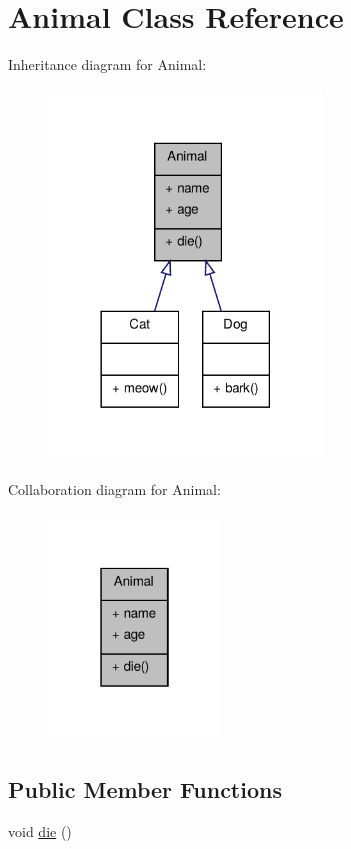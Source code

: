 \hypertarget{class_animal}{\section{Animal Class Reference}
\label{class_animal}
}


Inheritance diagram for Animal\+:\nopagebreak
\begin{figure}[H]
\begin{center}
\leavevmode
\includegraphics[width=206pt]{class_animal__inherit__graph}
\end{center}
\end{figure}


Collaboration diagram for Animal\+:\nopagebreak
\begin{figure}[H]
\begin{center}
\leavevmode
\includegraphics[width=130pt]{class_animal__coll__graph}
\end{center}
\end{figure}
\subsection*{Public Member Functions}
\begin{DoxyCompactItemize}
\item 
void \hyperlink{class_animal_a557fe0d71dda75be2f8459ce0d7c2275}{die} ()
\end{DoxyCompactItemize}
